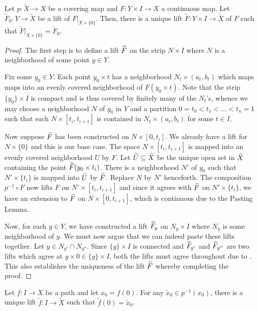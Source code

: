 \begin{theorem}
    Let $p:\widetilde X\to X$ be a covering map and $F: Y\times I\to X$ a continuous map. Let $\widetilde F_0: Y\to\widetilde X$ be a lift of $F|_{X\times\{0\}}$. Then, there is a unique lift $\widetilde F: Y\times I\to\widetilde X$ of $F$ such that $\widetilde F|_{X\times\{0\}} = \widetilde F_0$.
\end{theorem}
\begin{proof}
    The first step is to define a lift $\widetilde{F}$ on the strip $N\times I$ where $N$ is a neighborhood of some point $y\in Y$. 

    Fix some $y_0\in Y$. Each point $y_0\times t$ has a neighborhood $N_t\times(a_t,b_t)$ which maps maps into an evenly covered neighborhood of $F(y_0\times t)$. Note that the strip $\{y_0\}\times I$ is compact and is thus covered by finitely many of the $N_t$'s, whence we may choose a neighborhood $N$ of $y_0$ in $Y$ and a partition $0 = t_0 < t_1 < \dots < t_n = 1$ such that each $N\times [t_i, t_{i + 1}]$ is contained in $N_t\times(a_t,b_t)$ for some $t\in I$.

    Now suppose $\widetilde{F}$ has been constructed on $N\times[0,t_i]$. We already have a lift for $N\times\{0\}$ and this is our base case. The space $N\times[t_i, t_{i + 1}]$ is mapped into an evenly covered neighborhood $U$ by $F$. Let $\widetilde{U}\subseteq\widetilde{X}$ be the unique open set in $\widetilde{X}$ containing the point $\widetilde{F}(y_0\times t_i)$. There is a neighborhood $N'$ of $y_0$ such that $N'\times\{t_i\}$ is mapped into $\widetilde{U}$ by $\widetilde{F}$. Replace $N$ by $N'$ henceforth. The composition $p^{-1}\circ F$ now lifts $F$ on $N'\times[t_i, t_{i + 1}]$ and since it agrees with $\widetilde{F}$ on $N'\times\{t_i\}$, we have an extension to $\widetilde{F}$ on $N\times[0, t_{i + 1}]$, which is continuous due to the Pasting Lemma.

    Now, for each $y\in Y$, we have constructed a lift $\widetilde{F}_y$ on $N_y\times I$ where $N_y$ is some neighborhood of $y$. We must now argue that we can indeed paste these lifts together. Let $y\in N_{y'}\cap N_{y''}$. Since $\{y\}\times I$ is connected and $\widetilde{F}_{y'}$ and $\widetilde{F}_{y''}$ are two lifts which agree at $y\times 0\in\{y\}\times I$, both the lifts must agree throughout due to . This also establishes the uniqueness of the lift $\widetilde{F}$ whereby completing the proof.
\end{proof}

\begin{corollary}
    Let $f: I\to X$ be a path and let $x_0 = f(0)$. For any $\widetilde x_0\in p^{-1}(x_0)$, there is a unique lift $\widetilde f: I\to\widetilde X$ such that $\widetilde f(0) = \widetilde x_0$.
\end{corollary}

